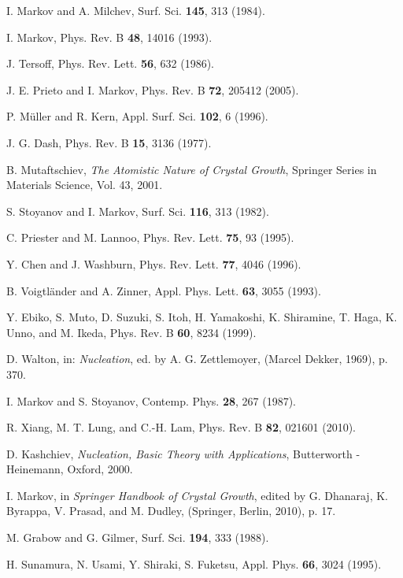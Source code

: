 \documentclass[aps,prl,showpacs,twocolumn,byrevtex,floatfix]{revtex4-1}
\begin{document}
\begin{thebibliography}{99}
I. Markov and A. Milchev, Surf. Sci. {\bf 145}, 313 (1984).

I. Markov, Phys. Rev. B {\bf 48}, 14016 (1993).

J. Tersoff, Phys. Rev. Lett. {\bf 56}, 632 (1986).

J. E. Prieto and I. Markov, Phys. Rev. B {\bf 72}, 205412 (2005).

P. M\"uller and R. Kern, Appl. Surf. Sci. {\bf 102}, 6 (1996).

J. G. Dash, Phys. Rev. B {\bf 15}, 3136 (1977).

B. Mutaftschiev, {\it The Atomistic Nature of Crystal Growth}, Springer Series
in Materials Science, Vol. 43, 2001.

S. Stoyanov and I. Markov, Surf. Sci. {\bf 116}, 313 (1982).

C. Priester and M. Lannoo, Phys. Rev. Lett. {\bf 75}, 93 (1995).

Y. Chen and J. Washburn, Phys. Rev. Lett. {\bf 77}, 4046 (1996).

B. Voigtl\"ander and A. Zinner, Appl. Phys. Lett. {\bf 63}, 3055 (1993).

Y. Ebiko, S. Muto, D. Suzuki, S. Itoh, H. Yamakoshi, K. Shiramine, T. Haga, K.
Unno, and M. Ikeda, Phys. Rev. B {\bf 60}, 8234 (1999).

D. Walton, in: {\it Nucleation}, ed. by A. G. Zettlemoyer, (Marcel Dekker,
1969), p. 370.

I. Markov and S. Stoyanov, Contemp. Phys. {\bf 28}, 267 (1987).

R. Xiang, M. T. Lung, and C.-H. Lam, Phys. Rev. B {\bf 82}, 021601 (2010).

D. Kashchiev, {\it Nucleation, Basic Theory with Applications}, Butterworth -
Heinemann, Oxford, 2000.

I. Markov, in {\it Springer Handbook of Crystal Growth}, edited by G. Dhanaraj,
K. Byrappa, V. Prasad, and M. Dudley, (Springer, Berlin, 2010), p. 17.

M. Grabow and G. Gilmer, Surf. Sci. {\bf 194}, 333 (1988).

H. Sunamura, N. Usami, Y. Shiraki, S. Fuketsu, Appl. Phys. {\bf 66}, 3024
(1995).


\end{thebibliography}
\end{document}
